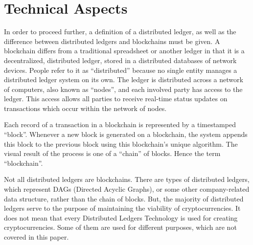 \documentclass[12pt]{article}
\begin{document}
\section{Technical Aspects}\label{sec:ta}
In order to proceed further, a definition of a distributed ledger, as well as
the difference between distributed ledgers and blockchains must be given. A
blockchain differs from a traditional spreadsheet or another ledger in that it
is a decentralized, distributed ledger, stored in a distributed databases of
network devices. People refer to it as ``distributed'' because no single entity
manages a distributed ledger system on its own. The
ledger is distributed across a network of computers, also known as ``nodes'', and
each involved party has access to the ledger. This access allows all parties to
receive real-time status updates on transactions which occur within the network
of nodes.

Each record of a transaction in a blockchain is represented by a timestamped
``block''. Whenever a new block is generated on a blockchain, the system
appends this block to the previous block using this blockchain’s unique
algorithm. The visual result of the process is one of a ``chain'' of blocks.
Hence the term ``blockchain''.

Not all distributed ledgers are blockchains. There are types of distributed
ledgers, which represent DAGs (Directed Acyclic Graphs), or some other
company-related data structure, rather than the chain of blocks. But, the
majority of distributed ledgers serve to the purpose of maintaining the
viability of cryptocurrencies. It does not mean that every Distributed Ledgers
Technology is used for creating cryptocurrencies. Some of them are used for
different purposes, which are not covered in this paper.

\end{document}
